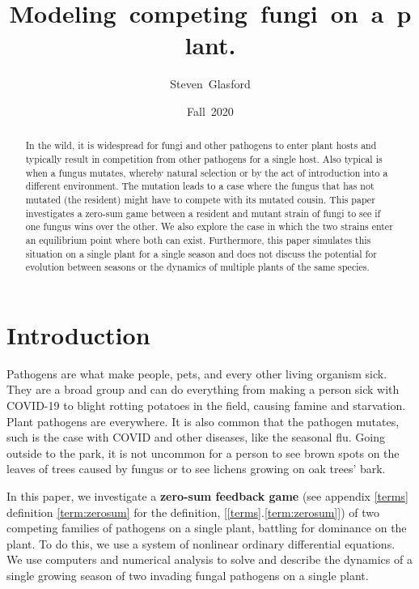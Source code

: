 \documentclass[11pt]{amsart}
\author{Steven~Glasford}
\title{Modeling~competing~fungi~on~a~plant.}
\begin{document}
\date{Fall~2020}

\maketitle

\begin{abstract}
    In the wild, it is widespread for fungi and other pathogens to enter plant hosts and typically result in competition from other pathogens for a single host. Also typical is when a fungus mutates, whereby natural selection or by the act of introduction into a different environment. The mutation leads to a case where the fungus that has not mutated (the resident) might have to compete with its mutated cousin.
    This paper investigates a zero-sum game between a resident and mutant strain of fungi to see if one fungus wins over the other. We also explore the case in which the two strains enter an equilibrium point where both can exist. Furthermore, this paper simulates this situation on a single plant for a single season and does not discuss the potential for evolution between seasons or the dynamics of multiple plants of the same species.
\end{abstract}


\section{Introduction}
Pathogens are what make people, pets, and every other living organism sick. They are a broad group and can do everything from making a person sick with COVID-19 to blight rotting potatoes in the field, causing famine and starvation. Plant pathogens are everywhere. It is also common that the pathogen mutates, such is the case with COVID and other diseases, like the seasonal flu. Going outside to the park, it is not uncommon for a person to see brown spots on the leaves of trees caused by fungus or to see lichens growing on oak trees' bark. 

In this paper, we investigate a \textbf{zero-sum feedback game} (see appendix \ref{terms} definition \ref{term:zerosum} for the definition, [\ref{terms}.\ref{term:zerosum}]) of two competing families of pathogens on a single plant, battling for dominance on the plant. To do this, we use a system of nonlinear ordinary differential equations. We use computers and numerical analysis to solve and describe the dynamics of a single growing season of two invading fungal pathogens on a single plant.
\end{document}
